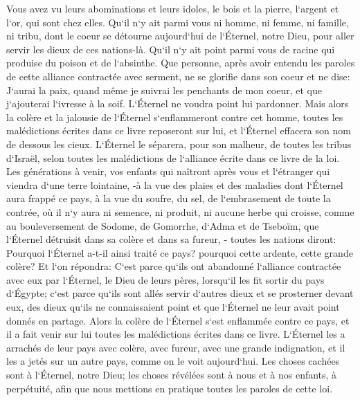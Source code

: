 \verse Vous avez vu leurs abominations et leurs idoles, le bois et la pierre, l`argent et l`or, qui sont chez elles. 
\verse Qu`il n`y ait parmi vous ni homme, ni femme, ni famille, ni tribu, dont le coeur se détourne aujourd`hui de l`Éternel, notre Dieu, pour aller servir les dieux de ces nations-là. Qu`il n`y ait point parmi vous de racine qui produise du poison et de l`absinthe. 
\verse Que personne, après avoir entendu les paroles de cette alliance contractée avec serment, ne se glorifie dans son coeur et ne dise: J`aurai la paix, quand même je suivrai les penchants de mon coeur, et que j`ajouterai l`ivresse à la soif. 
\verse L`Éternel ne voudra point lui pardonner. Mais alors la colère et la jalousie de l`Éternel s`enflammeront contre cet homme, toutes les malédictions écrites dans ce livre reposeront sur lui, et l`Éternel effacera son nom de dessous les cieux. 
\verse L`Éternel le séparera, pour son malheur, de toutes les tribus d`Israël, selon toutes les malédictions de l`alliance écrite dans ce livre de la loi. 
\verse Les générations à venir, vos enfants qui naîtront après vous et l`étranger qui viendra d`une terre lointaine, -à la vue des plaies et des maladies dont l`Éternel aura frappé ce pays, à la vue du soufre, du sel, 
\verse de l`embrasement de toute la contrée, où il n`y aura ni semence, ni produit, ni aucune herbe qui croisse, comme au bouleversement de Sodome, de Gomorrhe, d`Adma et de Tseboïm, que l`Éternel détruisit dans sa colère et dans sa fureur, - 
\verse toutes les nations diront: Pourquoi l`Éternel a-t-il ainsi traité ce pays? pourquoi cette ardente, cette grande colère? 
\verse Et l`on répondra: C`est parce qu`ils ont abandonné l`alliance contractée avec eux par l`Éternel, le Dieu de leurs pères, lorsqu`il les fit sortir du pays d`Égypte; 
\verse c`est parce qu`ils sont allés servir d`autres dieux et se prosterner devant eux, des dieux qu`ils ne connaissaient point et que l`Éternel ne leur avait point donnés en partage. 
\verse Alors la colère de l`Éternel s`est enflammée contre ce pays, et il a fait venir sur lui toutes les malédictions écrites dans ce livre. 
\verse L`Éternel les a arrachés de leur pays avec colère, avec fureur, avec une grande indignation, et il les a jetés sur un autre pays, comme on le voit aujourd`hui. 
\verse Les choses cachées sont à l`Éternel, notre Dieu; les choses révélées sont à nous et à nos enfants, à perpétuité, afin que nous mettions en pratique toutes les paroles de cette loi. 

\chapter{}

